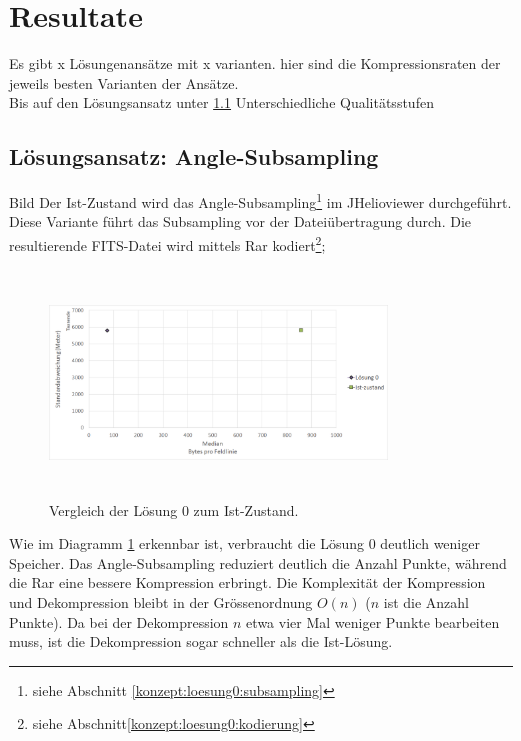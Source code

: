 \section{Resultate}\label{resultate}
Es gibt x Lösungenansätze mit x varianten.  hier sind die Kompressionsraten der jeweils besten Varianten der Ansätze.\\
Bis auf den Lösungsansatz unter \ref{resultate:loesung0} Unterschiedliche Qualitätsstufen

\subsection{Lösungsansatz: Angle-Subsampling} \label{resultate:loesung0}
Bild
Der Ist-Zustand wird das Angle-Subsampling\footnote{siehe Abschnitt \ref{konzept:loesung0:subsampling}} im JHelioviewer durchgeführt. Diese Variante führt das Subsampling vor der Dateiübertragung durch. Die resultierende FITS-Datei wird mittels Rar kodiert\footnote{siehe Abschnitt\ref{konzept:loesung0:kodierung}};
\begin{figure}[!htbp]
	\center
	\includegraphics[width=0.8\textwidth,height=6cm,keepaspectratio]{./pictures/resultate/loesung0/loesung0_0.png}
	\caption{Vergleich der Lösung 0 zum Ist-Zustand.}
	\label{resultate:loesung0:loesung0_0}
\end{figure}
Wie im Diagramm \ref{resultate:loesung0:loesung0_0} erkennbar ist, verbraucht die Lösung 0 deutlich weniger Speicher. Das Angle-Subsampling reduziert deutlich die Anzahl Punkte, während die Rar eine bessere Kompression erbringt. Die Komplexität der Kompression und Dekompression bleibt in der Grössenordnung $O(n)$ ($n$ ist die Anzahl Punkte). Da bei der Dekompression $n$ etwa vier Mal weniger Punkte bearbeiten muss, ist die Dekompression sogar schneller als die Ist-Lösung.\\
